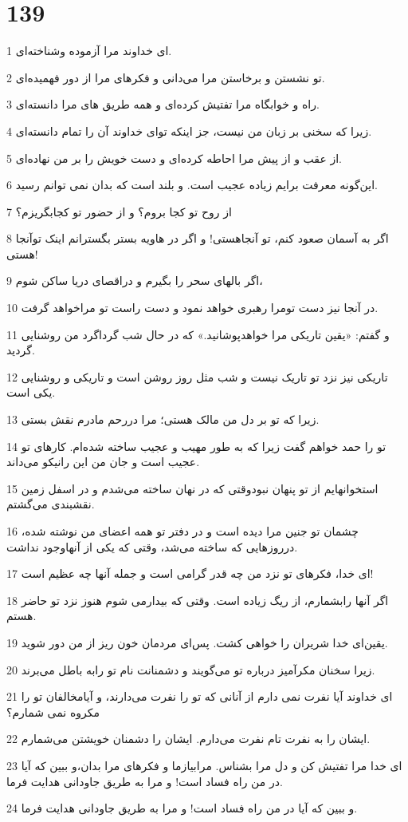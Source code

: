 \chapter{139}

\par 1 ای خداوند مرا آزموده وشناخته‌ای.
\par 2 تو نشستن و برخاستن مرا می‌دانی و فکرهای مرا از دور فهمیده‌ای.
\par 3 راه و خوابگاه مرا تفتیش کرده‌ای و همه طریق های مرا دانسته‌ای.
\par 4 زیرا که سخنی بر زبان من نیست، جز اینکه تو‌ای خداوند آن را تمام دانسته‌ای.
\par 5 از عقب و از پیش مرا احاطه کرده‌ای و دست خویش را بر من نهاده‌ای.
\par 6 این‌گونه معرفت برایم زیاده عجیب است. و بلند است که بدان نمی توانم رسید.
\par 7 از روح تو کجا بروم؟ و از حضور تو کجابگریزم؟
\par 8 اگر به آسمان صعود کنم، تو آنجاهستی! و اگر در هاویه بستر بگسترانم اینک توآنجا هستی!
\par 9 اگر بالهای سحر را بگیرم و دراقصای دریا ساکن شوم،
\par 10 در آنجا نیز دست تومرا رهبری خواهد نمود و دست راست تو مراخواهد گرفت.
\par 11 و گفتم: «یقین تاریکی مرا خواهدپوشانید.» که در حال شب گرداگرد من روشنایی گردید.
\par 12 تاریکی نیز نزد تو تاریک نیست و شب مثل روز روشن است و تاریکی و روشنایی یکی است.
\par 13 زیرا که تو بر دل من مالک هستی؛ مرا دررحم مادرم نقش بستی.
\par 14 تو را حمد خواهم گفت زیرا که به طور مهیب و عجیب ساخته شده‌ام. کارهای تو عجیب است و جان من این رانیکو می‌داند.
\par 15 استخوانهایم از تو پنهان نبودوقتی که در نهان ساخته می‌شدم و در اسفل زمین نقشبندی می‌گشتم.
\par 16 چشمان تو جنین مرا دیده است و در دفتر تو همه اعضای من نوشته شده، درروزهایی که ساخته می‌شد، وقتی که یکی از آنهاوجود نداشت.
\par 17 ‌ای خدا، فکرهای تو نزد من چه قدر گرامی است و جمله آنها چه عظیم است!
\par 18 اگر آنها رابشمارم، از ریگ زیاده است. وقتی که بیدارمی شوم هنوز نزد تو حاضر هستم.
\par 19 یقین‌ای خدا شریران را خواهی کشت. پس‌ای مردمان خون ریز از من دور شوید.
\par 20 زیرا سخنان مکرآمیز درباره تو می‌گویند و دشمنانت نام تو رابه باطل می‌برند.
\par 21 ‌ای خداوند آیا نفرت نمی دارم از آنانی که تو را نفرت می‌دارند، و آیامخالفان تو را مکروه نمی شمارم؟
\par 22 ایشان را به نفرت تام نفرت می‌دارم. ایشان را دشمنان خویشتن می‌شمارم.
\par 23 ‌ای خدا مرا تفتیش کن و دل مرا بشناس. مرابیازما و فکرهای مرا بدان،و ببین که آیا در من راه فساد است! و مرا به طریق جاودانی هدایت فرما.
\par 24 و ببین که آیا در من راه فساد است! و مرا به طریق جاودانی هدایت فرما.
 
